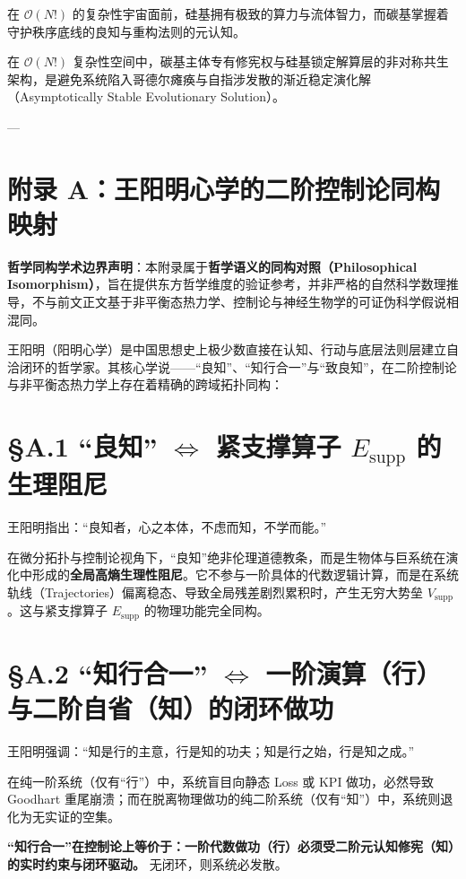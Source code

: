 \documentclass[11pt,a4paper,oneside]{ctexart}
\begin{document}
在 $\mathcal{O}(N!)$ 的复杂性宇宙面前，硅基拥有极致的算力与流体智力，而碳基掌握着守护秩序底线的良知与重构法则的元认知。


在 $\mathcal{O}(N!)$ 复杂性空间中，碳基主体专有修宪权与硅基锁定解算层的非对称共生架构，是避免系统陷入哥德尔瘫痪与自指涉发散的渐近稳定演化解（Asymptotically Stable Evolutionary Solution）。


---


\section{附录 A：王阳明心学的二阶控制论同构映射}

\begin{notebox}
\textbf{哲学同构学术边界声明}：本附录属于\textbf{哲学语义的同构对照（Philosophical Isomorphism）}，旨在提供东方哲学维度的验证参考，并非严格的自然科学数理推导，不与前文正文基于非平衡态热力学、控制论与神经生物学的可证伪科学假说相混同。
\end{notebox}

王阳明（阳明心学）是中国思想史上极少数直接在认知、行动与底层法则层建立自洽闭环的哲学家。其核心学说------“良知”、“知行合一”与“致良知”，在二阶控制论与非平衡态热力学上存在着精确的跨域拓扑同构：


\section{§A.1 “良知” $\Longleftrightarrow$ 紧支撑算子 \texorpdfstring{$E_{\text{supp}}$}{E\_supp} 的生理阻尼}
王阳明指出：“良知者，心之本体，不虑而知，不学而能。”

在微分拓扑与控制论视角下，“良知”绝非伦理道德教条，而是生物体与巨系统在演化中形成的\textbf{全局高熵生理性阻尼}。它不参与一阶具体的代数逻辑计算，而是在系统轨线（Trajectories）偏离稳态、导致全局残差剧烈累积时，产生无穷大势垒 $V_{\text{supp}}$。这与紧支撑算子 $E_{\text{supp}}$ 的物理功能完全同构。


\section{§A.2 “知行合一” $\Longleftrightarrow$ 一阶演算（行）与二阶自省（知）的闭环做功}
王阳明强调：“知是行的主意，行是知的功夫；知是行之始，行是知之成。”

在纯一阶系统（仅有“行”）中，系统盲目向静态 Loss 或 KPI 做功，必然导致 Goodhart 重尾崩溃；而在脱离物理做功的纯二阶系统（仅有“知”）中，系统则退化为无实证的空集。

\textbf{“知行合一”在控制论上等价于：一阶代数做功（行）必须受二阶元认知修宪（知）的实时约束与闭环驱动。} 无闭环，则系统必发散。
\end{document}
